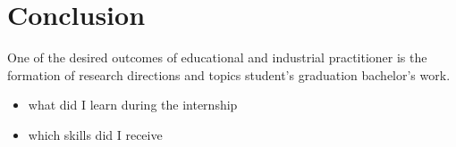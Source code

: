 \documentclass[../00_main.tex]{subfiles}
\begin{document}
\section{Conclusion}

One of the desired outcomes of educational and industrial
practitioner is the formation of research directions and topics
student's graduation bachelor's work.

\begin{itemize}
    \item what did I learn during the internship
    \item which skills did I receive
\end{itemize}
\end{document}

